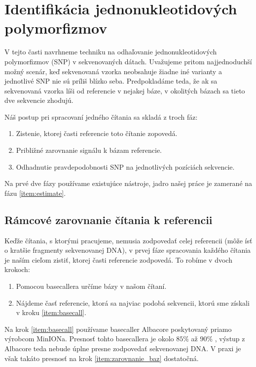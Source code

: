 \chapter{Identifikácia jednonukleotidových polymorfizmov}

\label{kap:identifikacia_SNP} 

V tejto časti navrhneme techniku na odhaľovanie jednonukleotidových
polymorfizmov (SNP) v sekvenovaných dátach. Uvažujeme pritom najjednoduchší
možný scenár, keď sekvenovaná vzorka neobsahuje žiadne iné varianty a jednotlivé
SNP nie sú príliš blízko seba. Predpokladáme teda, že ak sa sekvenovaná vzorka 
líši od referencie v nejakej báze, v okolitých bázach sa tieto dve sekvencie
zhodujú.

Náš postup pri spracovaní jedného čítania sa skladá z troch fáz:

\begin{enumerate}
\item Zistenie, ktorej časti referencie toto čítanie zopovedá.
\item Približné zarovnanie signálu k bázam referencie.
\item \label{item:estimate} Odhadnutie pravdepodobnosti SNP na jednotlivých pozíciách sekvencie.
\end{enumerate}

Na prvé dve fázy používame existujúce nástroje, jadro našej práce je
zamerané na fázu \ref{item:estimate}.

\section{Rámcové zarovnanie čítania k referencii}
\label{ramcove_zarovnanie}
Keďže čítania, s ktorými pracujeme, nemusia zodpovedať celej referencii (môže ísť o
kratšie fragmenty sekvenovanej DNA), v prvej fáze spracovania každého čítania
je naším cieľom zistiť, ktorej časti referencie zodpovedá. To robíme v dvoch krokoch:

\begin{enumerate}
\item \label{item:basecall} Pomocou basecallera určíme bázy v našom čítaní.
\item \label{item:zarovnanie_baz} Nájdeme časť referencie, ktorá sa najviac podobá sekvencii, ktorú sme 
získali v kroku \ref{item:basecall}.
\end{enumerate}

Na krok \ref{item:basecall} používame basecaller Albacore poskytovaný priamo výrobcom MinIONa.
Presnosť tohto basecallera je okolo $85\%$ až $90\%$ \cite{BasecallerComparison},
výstup z Albacore teda nebude úplne presne zodpovedať sekvenovanej
DNA. V praxi je však takáto presnosť na krok \ref{item:zarovnanie_baz} dostatočná.

